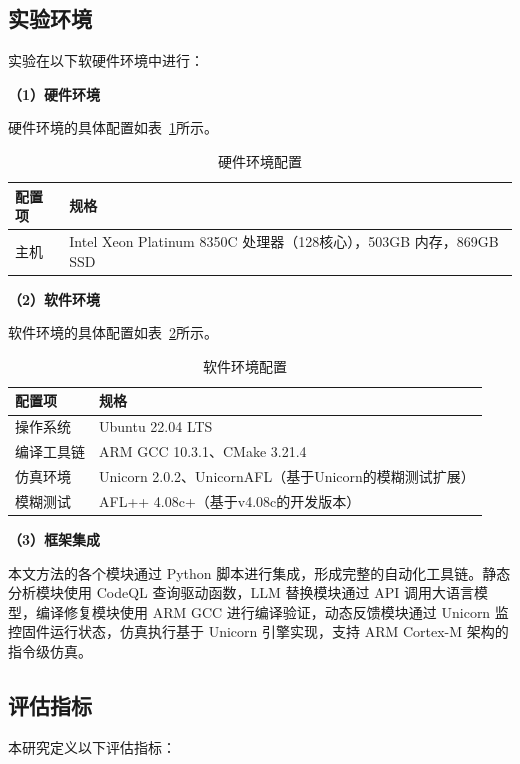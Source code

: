 \subsection{实验环境}

实验在以下软硬件环境中进行：

\textbf{（1）硬件环境}

硬件环境的具体配置如表~\ref{tab:hw_env}所示。

\begin{table}[htbp]
\centering
\caption{硬件环境配置}
\label{tab:hw_env}
\small
\begin{tabular}{ll}
\toprule
\textbf{配置项} & \textbf{规格} \\
\midrule
主机 & Intel Xeon Platinum 8350C 处理器（128核心），503GB 内存，869GB SSD \\
\bottomrule
\end{tabular}
\end{table}

\textbf{（2）软件环境}

软件环境的具体配置如表~\ref{tab:sw_env}所示。

\begin{table}[htbp]
\centering
\caption{软件环境配置}
\label{tab:sw_env}
\small
\begin{tabular}{ll}
\toprule
\textbf{配置项} & \textbf{规格} \\
\midrule
操作系统 & Ubuntu 22.04 LTS \\
编译工具链 & ARM GCC 10.3.1、CMake 3.21.4 \\
仿真环境 & Unicorn 2.0.2、UnicornAFL（基于Unicorn的模糊测试扩展） \\
模糊测试 & AFL++ 4.08c+（基于v4.08c的开发版本） \\
\bottomrule
\end{tabular}
\end{table}

\textbf{（3）框架集成}

本文方法的各个模块通过 Python 脚本进行集成，形成完整的自动化工具链。静态分析模块使用 CodeQL 查询驱动函数，LLM 替换模块通过 API 调用大语言模型，编译修复模块使用 ARM GCC 进行编译验证，动态反馈模块通过 Unicorn 监控固件运行状态，仿真执行基于 Unicorn 引擎实现，支持 ARM Cortex-M 架构的指令级仿真。

\subsection{评估指标}

本研究定义以下评估指标：

